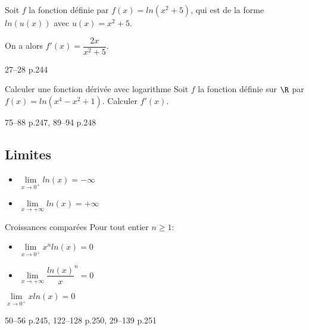 \documentclass[a4paper]{article}
\begin{document}
\begin{demonstrationp}{}{}
  \vspace{8cm}
\end{demonstrationp}

\begin{example}{}{}
Soit $f$ la fonction définie par $f(x)=ln(x^2+5)$, qui est de la forme $ln(u(x))$ avec $u(x)=x^2+5$.

On a alors $f'(x)=\dfrac{2x}{x^2+5}$.
\end{example}

\begin{exercices}{}{}
27--28 p.244
\end{exercices}


\begin{methode}{Calculer une fonction dérivée avec logarithme}{}
Soit $f$ la fonction définie sur $\R$ par $f(x)=ln(x^4-x^2+1)$. Calculer $f'(x)$.

\vspace{6cm}
\end{methode}

\begin{exercices}{}{}
75--88 p.247, 89--94 p.248
\end{exercices}

\pagebreak
\subsection{Limites}
\begin{propriete}{}{}

  \begin{itemize}[label=\textbullet]
    \item  $\lim\limits_{x \to 0^+} ln(x)=-\infty$
    \item $\lim\limits_{x \to +\infty} ln(x)=+\infty$
  \end{itemize}
\end{propriete}
\begin{propriete}{Croissances comparées}{}
  Pour tout entier $n\geqslant 1$:
  \begin{itemize}[label=\textbullet]
    \item  $\lim\limits_{x \to 0^+} x^n ln(x)=0$
    \item $\lim\limits_{x \to +\infty} \dfrac{ln(x)}x^n{}=0$
  \end{itemize}
\end{propriete}

\begin{demonstrationp}{ $\lim\limits_{x \to 0^+} x ln(x)=0$}{}
  \vspace{10cm}
  
\end{demonstrationp}

\begin{exercices}{}{}
50--56 p.245, 122--128 p.250, 29--139 p.251
\end{exercices}





  
\end{document}
